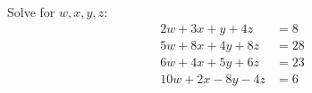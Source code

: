 Solve for $w,x,y,z$:
\[
\begin{aligned}
2w+3x+y+4z&=8\\
5w+8x+4y+8z&=28\\
6w+4x+5y+6z&=23\\
10w+2x-8y-4z&=6
\end{aligned}
\]

